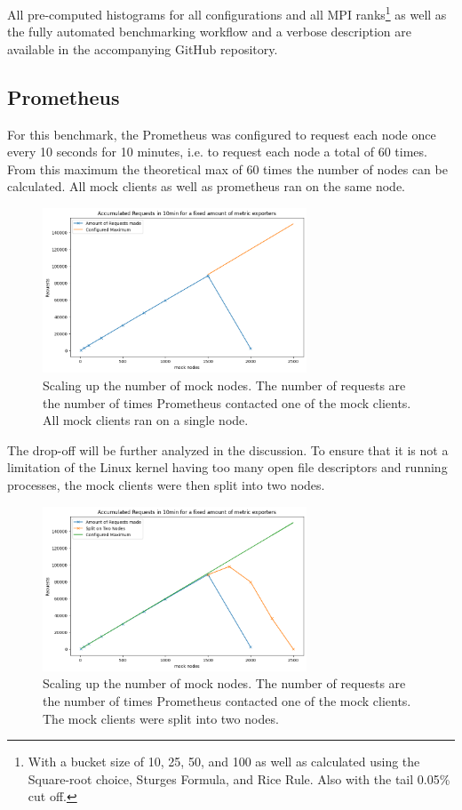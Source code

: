 All pre-computed histograms for all configurations and all MPI ranks\footnote{With a bucket size of 10, 25, 50, and 100 as well as calculated using the Square-root choice, Sturges Formula, and Rice Rule. Also with the tail 0.05\% cut off.} as well as the fully automated benchmarking workflow and a verbose description are available in the accompanying GitHub repository.

\subsection{Prometheus}
For this benchmark, the Prometheus was configured to request each node once every 10 seconds for 10 minutes, i.e. to request each node a total of 60 times. From this maximum the theoretical max of 60 times the number of nodes can be calculated. All mock clients as well as prometheus ran on the same node.

\begin{figure}[H]
  \centering
  \includegraphics[width=0.7\textwidth]{./plots/prometheus_1node.png}
  \caption{Scaling up the number of mock nodes. The number of requests are the number of times Prometheus contacted one of the mock clients. All mock clients ran on a single node.}
\end{figure}

The drop-off will be further analyzed in the discussion. To ensure that it is not a limitation of the Linux kernel having too many open file descriptors and running processes, the mock clients were then split into two nodes.

\begin{figure}[H]
  \centering
  \includegraphics[width=0.7\textwidth]{./plots/prometheus_2node.png}
  \caption{Scaling up the number of mock nodes. The number of requests are the number of times Prometheus contacted one of the mock clients. The mock clients were split into two nodes.}
\end{figure}

